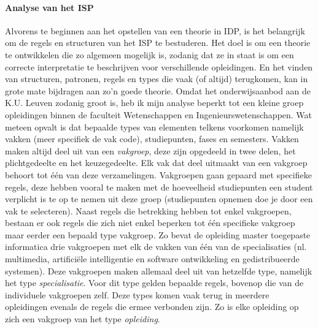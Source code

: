 \paragraph{Analyse van het ISP}
Alvorens te beginnen aan het opstellen van een theorie in IDP, is het belangrijk om de regels en structuren van het ISP te bestuderen. Het doel is om een theorie te ontwikkelen die zo algemeen mogelijk is, zodanig dat ze in staat is om een correcte interpretatie te beschrijven voor verschillende opleidingen. En het vinden van structuren, patronen, regels en types die vaak (of altijd) terugkomen, kan in grote mate bijdragen aan zo'n goede theorie. Omdat het onderwijsaanbod aan de K.U. Leuven zodanig groot is, heb ik mijn analyse beperkt tot een kleine groep opleidingen binnen de faculteit Wetenschappen en Ingenieurswetenschappen. Wat meteen opvalt is dat bepaalde types van elementen telkens voorkomen namelijk vakken (meer specifiek de vak code), studiepunten, fases en semesters. Vakken maken altijd deel uit van een \textit{vakgroep}, deze zijn opgedeeld in twee delen, het plichtgedeelte en het keuzegedeelte. Elk vak dat deel uitmaakt van een vakgroep behoort tot \'{e}\'{e}n van deze verzamelingen. Vakgroepen gaan gepaard met specifieke regels, deze hebben vooral te maken met de hoeveelheid studiepunten een student verplicht is te op te nemen uit deze groep (studiepunten opnemen doe je door een vak te selecteren). Naast regels die betrekking hebben tot enkel vakgroepen, bestaan er ook regels die zich niet enkel beperken tot \'{e}\'{e}n specifieke vakgroep maar eerder een bepaald type vakgroep. Zo bevat de opleiding master toegepaste informatica drie vakgroepen met elk de vakken van \'{e}\'{e}n van de specialisaties (nl. multimedia, artifici\"{e}le intelligentie en software ontwikkeling en gedistribueerde systemen). Deze vakgroepen maken allemaal deel uit van hetzelfde type, namelijk het type \textit{specialisatie}. Voor dit type gelden bepaalde regels, bovenop die van de individuele vakgroepen zelf. Deze types komen vaak terug in meerdere opleidingen evenals de regels die ermee verbonden zijn. 
Zo is elke opleiding op zich een vakgroep van het type \textit{opleiding}. 

